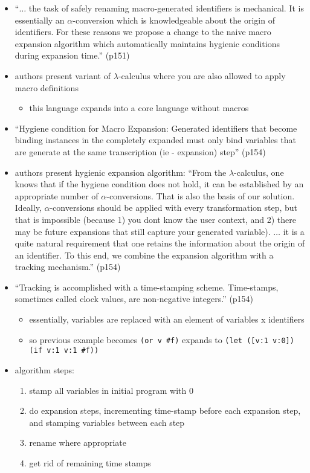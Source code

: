 \documentclass[12pt]{article}	%
\begin{document}
\begin{itemize}
		
	\item ``$\ldots$ the task of safely renaming macro-generated identifiers is mechanical. It is essentially an $\alpha$-conversion which is knowledgeable about the origin of identifiers. For these reasons we propose a change to the naive macro expansion algorithm which automatically maintains hygienic conditions during expansion time.'' (p151)
	
	\item authors present variant of $\lambda$-calculus where you are also allowed to apply macro definitions
		\begin{itemize}
			\item this language expands into a core language without macros
		\end{itemize}
		
	\item ``Hygiene condition for Macro Expansion: Generated identifiers that become binding instances in the completely expanded must only bind variables that are generate at the same transcription (ie - expansion) step'' (p154)
	
	\item authors present hygienic expansion algorithm: ``From the $\lambda$-calculus, one knows that if the hygiene condition does not hold, it can be established by an appropriate number of $\alpha$-conversions. That is also the basis of our solution. Ideally, $\alpha$-conversions should be applied with every transformation step, but that is impossible (because 1) you dont know the user context, and 2) there may be future expansions that still capture your generated variable). $\ldots$ it is a quite natural requirement that one retains the information about the origin of an identifier. To this end, we combine the expansion algorithm with a tracking mechanism.'' (p154)
	
	\item ``Tracking is accomplished with a time-stamping scheme. Time-stamps, sometimes called clock values, are non-negative integers.'' (p154)
		\begin{itemize}
			\item essentially, variables are replaced with an element of variables x identifiers
			\item so previous example becomes \verb!(or v #f)! expands to \verb!(let ([v:1 v:0]) (if v:1 v:1 #f))!
		\end{itemize}
		
	\item algorithm steps:
		\begin{enumerate}
				\item stamp all variables in initial program with 0
				\item do expansion steps, incrementing time-stamp before each expansion step, and stamping variables between each step
				\item rename where appropriate
				\item get rid of remaining time stamps
			\end{enumerate}
	
\end{itemize}
\end{document}
